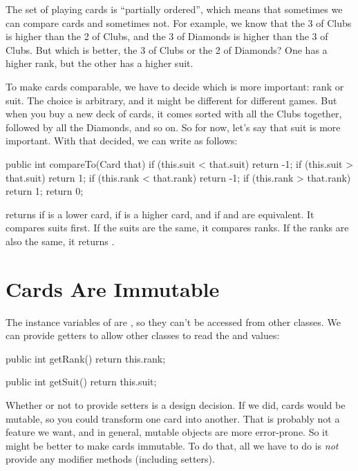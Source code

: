 The set of playing cards is ``partially ordered'', which means that sometimes we can compare cards and sometimes not.
For example, we know that the 3 of Clubs is higher than the 2 of Clubs, and the 3 of Diamonds is higher than the 3 of Clubs.
But which is better, the 3 of Clubs or the 2 of Diamonds?
One has a higher rank, but the other has a higher suit.


To make cards comparable, we have to decide which is more important: rank or suit.
The choice is arbitrary, and it might be different for different games.
But when you buy a new deck of cards, it comes sorted with all the Clubs together, followed by all the Diamonds, and so on.
So for now, let's say that suit is more important.
With that decided, we can write  as follows:

\begin{code}
public int compareTo(Card that) {
    if (this.suit < that.suit) {
        return -1;
    }
    if (this.suit > that.suit) {
        return 1;
    }
    if (this.rank < that.rank) {
        return -1;
    }
    if (this.rank > that.rank) {
        return 1;
    }
    return 0;
}
\end{code}

 returns  if  is a lower card,  if  is a higher card, and  if  and  are equivalent.
It compares suits first.
If the suits are the same, it compares ranks.
If the ranks are also the same, it returns .


\section{Cards Are Immutable}

The instance variables of  are , so they can't be accessed from other classes.
We can provide getters to allow other classes to read the  and  values:

\begin{code}
public int getRank() {
    return this.rank;
}

public int getSuit() {
    return this.suit;
}
\end{code}


Whether or not to provide setters is a design decision.
If we did, cards would be mutable, so you could transform one card into another.
That is probably not a feature we want, and in general, mutable objects are more error-prone.
So it might be better to make cards immutable.
To do that, all we have to do is {\em not} provide any modifier methods (including setters).

